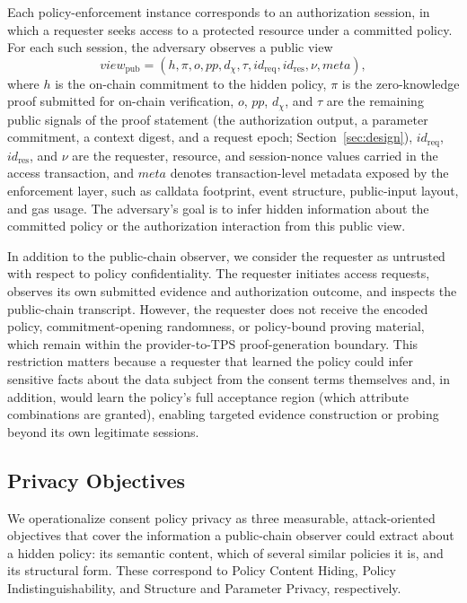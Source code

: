 Each policy-enforcement instance corresponds to an authorization session, in
which a requester seeks access to a protected resource under a committed policy.
For each such session, the adversary observes a public view
\begin{equation}
	\mathit{view}_{\mathrm{pub}}= (h, \pi, o, \mathit{pp}, d_{\chi}, \tau, \mathit{id}_{\mathrm{req}}, \mathit{id}_{\mathrm{res}}, \nu, \mathit{meta}),
\end{equation}
where $h$ is the on-chain commitment to the hidden policy, $\pi$ is the zero-knowledge proof submitted for on-chain verification, $o$, $\mathit{pp}$, $d_{\chi}$, and $\tau$ are the remaining public signals of the proof statement (the authorization output, a parameter commitment, a context digest, and a request epoch; Section~\ref{sec:design}), $\mathit{id}_{\mathrm{req}}$, $\mathit{id}_{\mathrm{res}}$, and $\nu$ are the requester, resource, and session-nonce values carried in the access transaction, and $\mathit{meta}$ denotes transaction-level metadata
exposed by the enforcement layer, such as calldata footprint, event structure, public-input layout, and gas usage. The adversary's goal is to infer hidden information about the committed policy or the authorization interaction from this public view.

In addition to the public-chain observer, we consider the requester as untrusted with respect to policy confidentiality.
The requester initiates access requests, observes its own submitted evidence and authorization outcome, and inspects the public-chain transcript.
However, the requester does not receive the encoded policy, commitment-opening randomness, or policy-bound proving material, which remain within the provider-to-TPS proof-generation boundary.
This restriction matters because a requester that learned the policy could infer sensitive facts about the data subject from the consent terms themselves and, in addition, would learn the policy's full acceptance region (which attribute combinations are granted), enabling targeted evidence construction or probing beyond its own legitimate sessions.

\subsection{Privacy Objectives}
\label{subsec:privacy-objectives}

We operationalize consent policy privacy as three measurable, attack-oriented objectives that cover the information a public-chain observer could extract about a hidden policy: its semantic content, which of several similar policies it is, and its structural form.
These correspond to Policy Content Hiding, Policy Indistinguishability, and Structure and Parameter Privacy, respectively.

